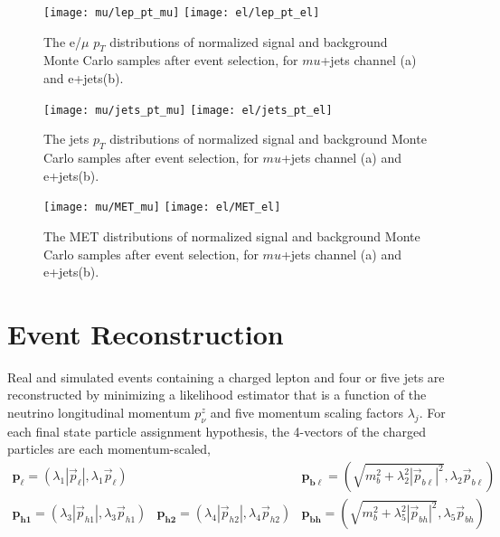 \documentclass{cmspaperpdf}
\begin{document}
\begin{figure}[htb]
\texttt{[image: mu/lep\_pt\_mu]}
\texttt{[image: el/lep\_pt\_el]}
\centering
\caption{\small \small The e/$\mu$ $p_T$ distributions of normalized signal and background Monte Carlo samples after event selection, for $mu$+jets channel (a) and e+jets(b). }
\label{fig:lep_pt}
\end{figure}

\begin{figure}[htb]
\texttt{[image: mu/jets\_pt\_mu]}
\texttt{[image: el/jets\_pt\_el]}
\centering
\caption{\small \small The jets $p_T$ distributions of normalized signal and background Monte Carlo samples after event selection, for $mu$+jets channel (a) and e+jets(b). }
\label{fig:jets_pt}
\end{figure}

\begin{figure}[htb]
\texttt{[image: mu/MET\_mu]}
\texttt{[image: el/MET\_el]}
\centering
\caption{\small \small The MET distributions of normalized signal and background Monte Carlo samples after event selection, for $mu$+jets channel (a) and e+jets(b). }
\label{fig:met}
\end{figure}

\clearpage
\section{Event Reconstruction}
\label{sec:reconstruction}

Real and simulated events containing a charged lepton and four or five jets are reconstructed by minimizing a likelihood estimator that is a function of the neutrino longitudinal momentum $p_\nu^z$ and five momentum scaling factors $\lambda_j$.  For each final state particle assignment hypothesis, the 4-vectors of the charged particles are each momentum-scaled,
\begin{equation}
\begin{array}{lll}
\boldsymbol{p_\ell} = \left(\lambda_1|\vec p_\ell |, \lambda_1\vec p_\ell\right) & &
\boldsymbol{p_{b\ell}} = \left(\sqrt{m_b^2+\lambda_2^2|\vec p_{b\ell}|^2}, \lambda_2\vec p_{b\ell}\right)  \\
\boldsymbol{p_{h1}} = \left(\lambda_3|\vec p_{h1} |, \lambda_3\vec p_{h1}\right) &
\boldsymbol{p_{h2}} = \left(\lambda_4|\vec p_{h2} |, \lambda_4\vec p_{h2}\right) &
\boldsymbol{p_{bh}} = \left(\sqrt{m_b^2+\lambda_5^2|\vec p_{bh}|^2}, \lambda_5\vec p_{bh}\right)
\end{array}
\end{equation}
\end{document}
